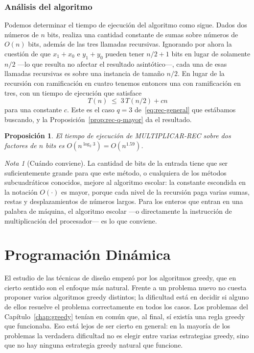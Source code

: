 \documentclass[12pt, spanish, oneside, openany]{book}
\newcommand{\alg}[1]{#1}
\theoremstyle{uprightplain}
\newtheorem{proposicion}[teorema]{Proposición}
\theoremstyle{definition}
\theoremstyle{remark}
\newtheorem{nota}[teorema]{Nota}
\theoremstyle{definition}
\begin{document}
\subsection{Análisis del algoritmo}

Podemos determinar el tiempo de ejecución del algoritmo como sigue. Dados dos números de $n$ bits, realiza una cantidad constante de sumas sobre números de $O(n)$ bits, además de las tres llamadas recursivas. Ignorando por ahora la cuestión de que $x_1+x_0$ e $y_1+y_0$ pueden tener $n/2+1$ bits en lugar de solamente $n/2$ ---lo que resulta no afectar el resultado asintótico---, cada una de esas llamadas recursivas es sobre una instancia de tamaño $n/2$. En lugar de la recursión con ramificación en cuatro tenemos entonces una con ramificación en tres, con un tiempo de ejecución que satisface
\[
T(n) \;\le\; 3\,T(n/2) + cn
\]
para una constante $c$. Este es el caso $q=3$ de~\eqref{eq:rec-general} que estábamos buscando, y la Proposición~\ref{prop:rec-q-mayor} da el resultado.

\begin{proposicion}
\label{prop:karatsuba}
El tiempo de ejecución de \alg{MULTIPLICAR-REC} sobre dos factores de $n$ bits es $O(n^{\log_2 3})=O(n^{1.59})$.
\end{proposicion}

\begin{nota}[Cuándo conviene]
\label{nota:karatsuba-constantes}
La cantidad de bits de la entrada tiene que ser suficientemente grande para que este método, o cualquiera de los métodos subcuadráticos conocidos, mejore al algoritmo escolar: la constante escondida en la notación $O(\cdot)$ es mayor, porque cada nivel de la recursión paga varias sumas, restas y desplazamientos de números largos. Para los enteros que entran en una palabra de máquina, el algoritmo escolar ---o directamente la instrucción de multiplicación del procesador--- es lo que conviene.
\end{nota}

\chapter{Programación Dinámica}
\label{chap:dp}

El estudio de las técnicas de diseño empezó por los algoritmos greedy, que en cierto sentido son el enfoque más natural. Frente a un problema nuevo no cuesta proponer varios algoritmos greedy distintos; la dificultad está en decidir si alguno de ellos resuelve el problema correctamente en todos los casos. Los problemas del Capítulo~\ref{chap:greedy} tenían en común que, al final, sí existía una regla greedy que funcionaba. Eso está lejos de ser cierto en general: en la mayoría de los problemas la verdadera dificultad no es elegir entre varias estrategias greedy, sino que no hay ninguna estrategia greedy natural que funcione.
\end{document}
